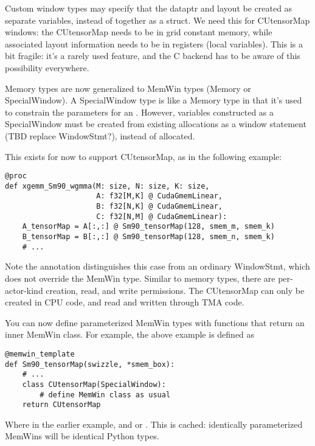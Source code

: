 \filbreak
{} Custom window types may specify that the dataptr and layout be created as separate variables, instead of together as a struct.
We need this for CUtensorMap windows: the CUtensorMap needs to be in grid constant memory, while associated layout information needs to be in registers (local variables).
This is a bit fragile: it's a rarely used feature, and the C backend has to be aware of this possibility everywhere.

\filbreak
{} Memory types are now generalized to MemWin types (Memory or SpecialWindow).
A SpecialWindow type is like a Memory type in that it's used to constrain the parameters for an .
However, variables constructed as a SpecialWindow must be created from existing allocations as a window statement (TBD replace WindowStmt?), instead of allocated.

\filbreak
This exists for now to support CUtensorMap, as in the following example:
{\color{lightttColor}
\begin{verbatim}
@proc
def xgemm_Sm90_wgmma(M: size, N: size, K: size,
                     A: f32[M,K] @ CudaGmemLinear,
                     B: f32[N,K] @ CudaGmemLinear,
                     C: f32[N,M] @ CudaGmemLinear):
    A_tensorMap = A[:,:] @ Sm90_tensorMap(128, smem_m, smem_k)
    B_tensorMap = B[:,:] @ Sm90_tensorMap(128, smem_n, smem_k)
    # ...
\end{verbatim}
}

\filbreak
Note the  annotation distinguishes this case from an ordinary WindowStmt, which does not override the MemWin type.
Similar to memory types, there are per-actor-kind creation, read, and write permissions.
The CUtensorMap can only be created in CPU code, and read and written through TMA code.

\filbreak
{} You can now define parameterized MemWin types with functions that return an inner MemWin class.
For example, the above  example is defined as
{\color{lightttColor}
\begin{verbatim}
@memwin_template
def Sm90_tensorMap(swizzle, *smem_box):
    # ...
    class CUtensorMap(SpecialWindow):
        # define MemWin class as usual
    return CUtensorMap
\end{verbatim}
}
Where in the earlier example,  and  or .
This is cached: identically parameterized MemWins will be identical Python types.

